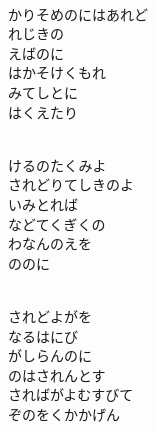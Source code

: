 \documentclass[10pt,b5j]{tarticle} %
\begin{document}
\begin{enumerate}
\begin{minipage}[c]{\blocksize}
    \end{minipage}
    \begin{minipage}[c]{\blocksize}
        
        \vspace{\linespace}
        \item~\\
        かりそめのにはあれど\\
        れじきの\\
        えばのに\\
        はかそけくもれ\\
        みてしとに\\
        はくえたり
        
    \end{minipage}
    \begin{minipage}[c]{\blocksize}
        
        \vspace{\linespace}
        \item~\\
        けるのたくみよ\\
        されどりてしきのよ\\
        いみとれば\\
        などてくぎくの\\
        わなんのえを\\
        ののに
        
    \end{minipage}
    \begin{minipage}[c]{\blocksize}
        
        \vspace{\linespace}
        \item~\\
        されどよがを\\
        なるはにび\\
        がしらんのに\\
        のはされんとす\\
        さればがよむすびて\\
        ぞのをくかかげん
    
    \end{minipage}
\end{enumerate} %
\end{document}
